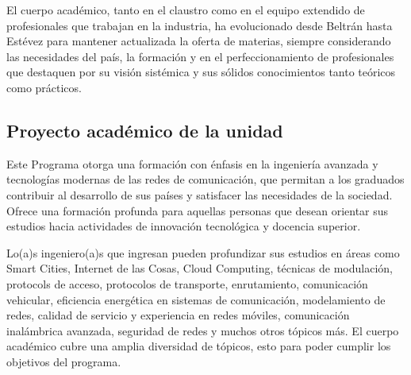 El cuerpo académico, tanto en el claustro como en el equipo extendido de profesionales que trabajan en la industria, ha evolucionado desde Beltrán hasta Estévez para mantener actualizada la oferta de materias, siempre considerando las necesidades del país, la formación y en el perfeccionamiento de profesionales que destaquen por su visión sistémica y sus sólidos conocimientos tanto teóricos como prácticos.


\subsection{Proyecto académico de la unidad}

Este Programa otorga una formación con énfasis en la ingeniería avanzada y tecnologías
modernas de las redes de comunicación, que permitan a los graduados contribuir al desarrollo de sus países y satisfacer las
necesidades de la sociedad. Ofrece una formación profunda para
aquellas personas que desean orientar sus estudios hacia actividades de innovación tecnológica y docencia superior.

Lo(a)s ingeniero(a)s que ingresan pueden profundizar sus estudios en áreas como Smart Cities, Internet de las Cosas, Cloud Computing, 
técnicas de modulación, protocols de acceso, protocolos de transporte, enrutamiento, comunicación vehicular, eficiencia energética
en sistemas de comunicación, modelamiento de redes, calidad de servicio y experiencia en redes móviles, comunicación inalámbrica avanzada, 
seguridad de redes y muchos otros tópicos más. El cuerpo académico cubre una amplia diversidad de tópicos, esto para poder cumplir 
los objetivos del programa.
